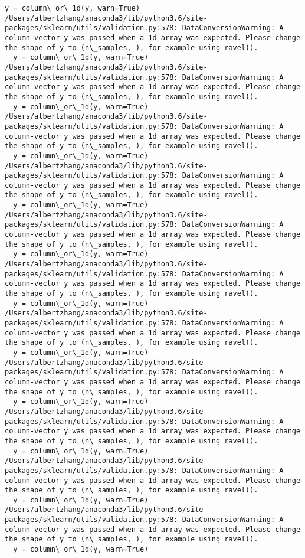 \documentclass[11pt]{article}
\begin{document}
\begin{Verbatim}[commandchars=\\\{\}]
  y = column\_or\_1d(y, warn=True)
/Users/albertzhang/anaconda3/lib/python3.6/site-packages/sklearn/utils/validation.py:578: DataConversionWarning: A column-vector y was passed when a 1d array was expected. Please change the shape of y to (n\_samples, ), for example using ravel().
  y = column\_or\_1d(y, warn=True)
/Users/albertzhang/anaconda3/lib/python3.6/site-packages/sklearn/utils/validation.py:578: DataConversionWarning: A column-vector y was passed when a 1d array was expected. Please change the shape of y to (n\_samples, ), for example using ravel().
  y = column\_or\_1d(y, warn=True)
/Users/albertzhang/anaconda3/lib/python3.6/site-packages/sklearn/utils/validation.py:578: DataConversionWarning: A column-vector y was passed when a 1d array was expected. Please change the shape of y to (n\_samples, ), for example using ravel().
  y = column\_or\_1d(y, warn=True)
/Users/albertzhang/anaconda3/lib/python3.6/site-packages/sklearn/utils/validation.py:578: DataConversionWarning: A column-vector y was passed when a 1d array was expected. Please change the shape of y to (n\_samples, ), for example using ravel().
  y = column\_or\_1d(y, warn=True)
/Users/albertzhang/anaconda3/lib/python3.6/site-packages/sklearn/utils/validation.py:578: DataConversionWarning: A column-vector y was passed when a 1d array was expected. Please change the shape of y to (n\_samples, ), for example using ravel().
  y = column\_or\_1d(y, warn=True)
/Users/albertzhang/anaconda3/lib/python3.6/site-packages/sklearn/utils/validation.py:578: DataConversionWarning: A column-vector y was passed when a 1d array was expected. Please change the shape of y to (n\_samples, ), for example using ravel().
  y = column\_or\_1d(y, warn=True)
/Users/albertzhang/anaconda3/lib/python3.6/site-packages/sklearn/utils/validation.py:578: DataConversionWarning: A column-vector y was passed when a 1d array was expected. Please change the shape of y to (n\_samples, ), for example using ravel().
  y = column\_or\_1d(y, warn=True)
/Users/albertzhang/anaconda3/lib/python3.6/site-packages/sklearn/utils/validation.py:578: DataConversionWarning: A column-vector y was passed when a 1d array was expected. Please change the shape of y to (n\_samples, ), for example using ravel().
  y = column\_or\_1d(y, warn=True)
/Users/albertzhang/anaconda3/lib/python3.6/site-packages/sklearn/utils/validation.py:578: DataConversionWarning: A column-vector y was passed when a 1d array was expected. Please change the shape of y to (n\_samples, ), for example using ravel().
  y = column\_or\_1d(y, warn=True)
/Users/albertzhang/anaconda3/lib/python3.6/site-packages/sklearn/utils/validation.py:578: DataConversionWarning: A column-vector y was passed when a 1d array was expected. Please change the shape of y to (n\_samples, ), for example using ravel().
  y = column\_or\_1d(y, warn=True)
/Users/albertzhang/anaconda3/lib/python3.6/site-packages/sklearn/utils/validation.py:578: DataConversionWarning: A column-vector y was passed when a 1d array was expected. Please change the shape of y to (n\_samples, ), for example using ravel().
  y = column\_or\_1d(y, warn=True)

    \end{Verbatim}
\end{document}
